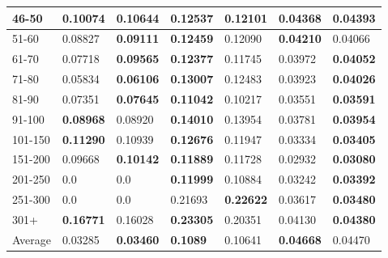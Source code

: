 \begin{table*}[h!]
\begin{tabular}{|l|l|l||l|l||l|l|}
        46-50   & 0.10074                                 & \textbf{0.10644}               & \textbf{0.12537}                 & 0.12101           & 0.04368          & \textbf{0.04393}  \\ \hline
        51-60   & 0.08827                                 & \textbf{0.09111}               & \textbf{0.12459}                 & 0.12090           & \textbf{0.04210} & 0.04066           \\ \hline
        61-70   & 0.07718                                 & \textbf{0.09565}               & \textbf{0.12377}                 & 0.11745           & 0.03972          & \textbf{0.04052}  \\ \hline
        71-80   & 0.05834                                 & \textbf{0.06106}               & \textbf{0.13007}                 & 0.12483           & 0.03923          & \textbf{0.04026}  \\ \hline
        81-90   & 0.07351                                 & \textbf{0.07645}               & \textbf{0.11042}                 & 0.10217           & 0.03551          & \textbf{0.03591}  \\ \hline
        91-100  & \textbf{0.08968}                        & 0.08920                        & \textbf{0.14010}                 & 0.13954           & 0.03781          & \textbf{0.03954}  \\ \hline
        101-150 & \textbf{0.11290}                        & 0.10939                        & \textbf{0.12676}                 & 0.11947           & 0.03334          & \textbf{0.03405}  \\ \hline
        151-200 & 0.09668                                 & \textbf{0.10142}               & \textbf{0.11889}                 & 0.11728           & 0.02932          & \textbf{0.03080}  \\ \hline
        201-250 & 0.0                                     & 0.0                            & \textbf{0.11999}                 & 0.10884           & 0.03242          & \textbf{0.03392}  \\ \hline
        251-300 & 0.0                                     & 0.0                            & 0.21693                          & \textbf{0.22622}  & 0.03617          & \textbf{0.03480}  \\ \hline
        301+    & \textbf{0.16771}                        & 0.16028                        & \textbf{0.23305}                 & 0.20351           & 0.04130          & \textbf{0.04380}  \\ \hline
        Average & 0.03285                                 & \textbf{0.03460}               & \textbf{0.1089}                  & 0.10641           & \textbf{0.04668} & 0.04470           \\ \hline
    \end{tabular}
    \label{tab:ndcg-adjusted-layer-remove-0-embedding}
\end{table*}

